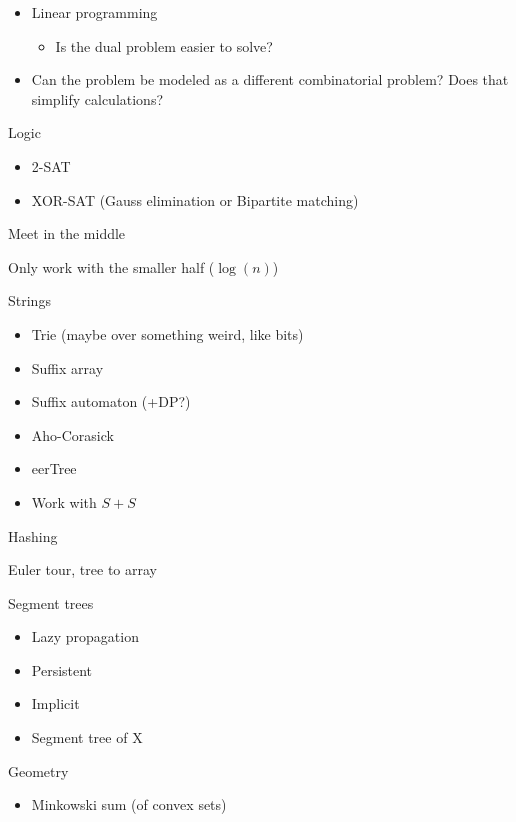 \begin{myitemize}
\begin{itemize}
\begin{itemize}
              \end{itemize}
            \item Linear programming
              \begin{itemize}
                \item Is the dual problem easier to solve?
              \end{itemize}
            \item Can the problem be modeled as a different combinatorial problem? Does that simplify calculations?
          \end{itemize}
        \item Logic
          \begin{itemize}
            \item 2-SAT
            \item XOR-SAT (Gauss elimination or Bipartite matching)
          \end{itemize}
        \item Meet in the middle
        \item Only work with the smaller half ($\log(n)$)
        \item Strings
          \begin{itemize}
            \item Trie (maybe over something weird, like bits)
            \item Suffix array
            \item Suffix automaton (+DP?)
            \item Aho-Corasick
            \item eerTree
            \item Work with $S+S$
          \end{itemize}
        \item Hashing
        \item Euler tour, tree to array
        \item Segment trees
          \begin{itemize}
            \item Lazy propagation
            \item Persistent
            \item Implicit
            \item Segment tree of X
          \end{itemize}
        \item Geometry
          \begin{itemize}
            \item Minkowski sum (of convex sets)

\end{itemize}
\end{myitemize}
